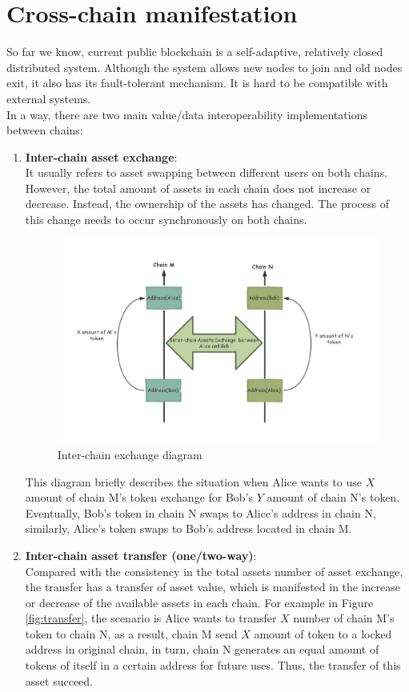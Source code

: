 \section{Cross-chain manifestation}
\label{sec:cm}
\noindent So far we know, current public blockchain is a self-adaptive, relatively closed distributed system. Although the system allows new nodes to join and old nodes exit, it also has its fault-tolerant mechanism. It is hard to be compatible with external systems. \\

\noindent In a way, there are two main value/data interoperability implementations between chains:
\begin{enumerate}
    \item \textbf{Inter-chain asset exchange}: \\
    It usually refers to asset swapping between different users on both chains. However, the total amount of assets in each chain does not increase or decrease. Instead, the ownership of the assets has changed. The process of this change needs to occur synchronously on both chains. \\
    \begin{figure}[H]
    \includegraphics[width=1\textwidth]{./figures/asset_swap.png}
    \centering
    \caption{Inter-chain exchange diagram}%
    \centering
    \label{fig:swap}
    \end{figure}
    
    This diagram briefly describes the situation when Alice wants to use $X$ amount of chain M's token exchange for Bob's $Y$ amount of chain N's token. Eventually, Bob's token in chain N swaps to Alice's address in chain N, similarly, Alice's token swaps to Bob's address located in chain M.
    \item \textbf{Inter-chain asset transfer (one/two-way)}: \\
    Compared with the consistency in the total assets number of asset exchange, the transfer has a transfer of asset value, which is manifested in the increase or decrease of the available assets in each chain. For example in Figure \ref{fig:transfer}, the scenario is Alice wants to transfer $X$ number of chain M's token to chain N, as a result, chain M send $X$ amount of token to a locked address in original chain, in turn, chain N generates an equal amount of tokens of itself in a certain address for future uses. Thus, the transfer of this asset succeed.


\end{enumerate}
